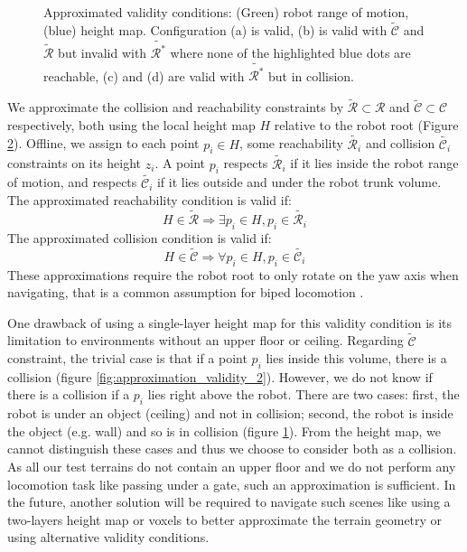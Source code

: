 \begin{figure}[ht]
\begin{subfigure}[t]{.35\linewidth}
    \caption{\label{fig:approximation_validity_3}}
    \end{subfigure}
    \caption{Approximated validity conditions: (Green) robot range of motion, (blue) height map. Configuration (a) is valid, (b) is valid with $\tilde{\mathcal{C}}$ and $\tilde{\mathcal{R}}$ but invalid with $\tilde{\mathcal{R}^*}$ where none of the highlighted blue dots are reachable, (c) and (d) are valid with $\tilde{\mathcal{R}^*}$ but in collision.}
    \label{fig:approximation_validity}
\end{figure}

We approximate the collision and reachability constraints by $\tilde{\mathcal{R}} \subset \mathcal{R}$ and $\tilde{\mathcal{C}} \subset \mathcal{C}$ respectively, both using the local height map $H$ relative to the robot root (Figure \ref{fig:approximation_validity}).
Offline, we assign to each point $p_i \in H$, some reachability $\tilde{\mathcal{R}_i}$ and collision $\tilde{\mathcal{C}_i}$ constraints on its height $z_i$. 
A point $p_i$ respects $\tilde{\mathcal{R}_i}$ if it lies inside the robot range of motion, and respects $\tilde{\mathcal{C}_i}$ if it lies outside and under the robot trunk volume. 
The approximated reachability condition is valid if:
\begin{equation}
    H \in \tilde{\mathcal{R}} \Rightarrow \exists p_i \in H, p_i \in \tilde{\mathcal{R}_i}
\end{equation}
The approximated collision condition is valid if:
\begin{equation}
    H \in \tilde{\mathcal{C}} \Rightarrow \forall p_i \in H, p_i \in \tilde{\mathcal{C}_i}
\end{equation}
These approximations require the robot root to only rotate on the yaw axis when navigating, that is a common assumption for biped locomotion \cite{deits2014FootPlanMI}.

One drawback of using a single-layer height map for this validity condition is its limitation to environments without an upper floor or ceiling.
Regarding $\tilde{\mathcal{C}}$ constraint, the trivial case is that if a point $p_i$ lies inside this volume, there is a collision (figure \ref{fig:approximation_validity_2}). However, we do not know if there is a collision if a $p_i$ lies right above the robot. 
There are two cases: first, the robot is under an object (ceiling) and not in collision; second, the robot is inside the object (e.g. wall) and so is in collision (figure \ref{fig:approximation_validity_3}).
From the height map, we cannot distinguish these cases and thus we choose to consider both as a collision.
As all our test terrains do not contain an upper floor and we do not perform any locomotion task like passing under a gate, such an approximation is sufficient. 
In the future, another solution will be required to navigate such scenes like using a two-layers height map or voxels to better approximate the terrain geometry or using alternative validity conditions.

